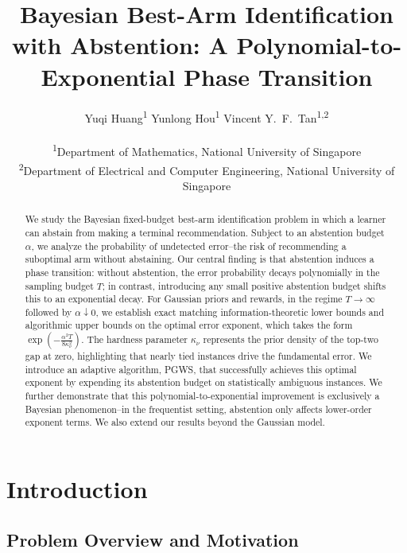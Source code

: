 \documentclass[10pt]{article}
\title{Bayesian Best-Arm Identification with Abstention: A Polynomial-to-Exponential Phase Transition}
\author{Yuqi Huang\textsuperscript{1}\quad
Yunlong Hou\textsuperscript{1}\quad
Vincent Y.~F.~Tan\textsuperscript{1,2} \\ \\
\textsuperscript{1}Department of Mathematics, National University of Singapore\\  \textsuperscript{2}Department of Electrical and Computer Engineering, National University of Singapore
}
\date{}
\theoremstyle{plain}
\begin{document}
\maketitle


\begin{abstract}
We study the Bayesian fixed-budget best-arm identification problem in which a learner can abstain from making a terminal recommendation. Subject to an abstention budget $\alpha$, we analyze the probability of undetected error--the risk of recommending a suboptimal arm without abstaining.
Our central finding is that abstention induces a phase transition: without abstention, the error probability decays polynomially in the sampling budget $T$; in contrast, introducing any small positive abstention budget shifts this to an exponential decay.
For Gaussian priors and rewards, in the regime $T\to\infty$ followed by $\alpha\downarrow0$, we establish exact matching information-theoretic lower bounds and algorithmic upper bounds on the optimal error exponent, which takes the form $\exp(-\frac{\alpha^{2}T}{8\kappa_{\nu}^{2}})$. The hardness parameter $\kappa_{\nu}$ represents the prior density of the top-two gap at zero, highlighting that nearly tied instances drive the fundamental error. We introduce an adaptive algorithm, \textsc{PGWS}, that successfully achieves this optimal exponent by expending its abstention budget on statistically ambiguous instances.
We further demonstrate that this polynomial-to-exponential improvement is exclusively a Bayesian phenomenon--in the frequentist setting, abstention only affects lower-order exponent terms. We also extend our results beyond the Gaussian model.
\end{abstract}






















\section{Introduction}\label{sec:Intro}

\subsection{Problem Overview and Motivation}
\label{subsec:problem-overview}
\end{document}
